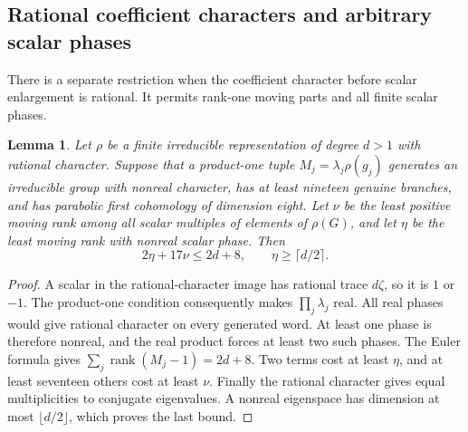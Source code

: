 \documentclass[11pt]{article}
\newtheorem{lemma}[theorem]{Lemma}
\theoremstyle{definition}
\theoremstyle{remark}
\begin{document}
\subsection{Rational coefficient characters and arbitrary scalar phases}

There is a separate restriction when the coefficient character before
scalar enlargement is rational.  It permits rank-one moving parts and
all finite scalar phases.

\begin{lemma}\label{lem:rational-scalar-budget}
Let $\rho$ be a finite irreducible representation of degree $d>1$
with rational character.  Suppose that a product-one tuple
$M_j=\lambda_j\rho(g_j)$ generates an irreducible group with nonreal
character, has at least nineteen genuine branches, and has parabolic
first cohomology of dimension eight.  Let $\nu$ be the least positive
moving rank among all scalar multiples of elements of $\rho(G)$,
and let $\eta$ be the least moving rank with nonreal scalar phase.
Then
\[
 2\eta+17\nu\le 2d+8,\qquad \eta\ge\lceil d/2\rceil.
\]
\end{lemma}
\begin{proof}
A scalar in the rational-character image has rational trace $d\zeta$,
so it is $1$ or $-1$.  The product-one condition consequently makes
$\prod_j\lambda_j$ real.  All real phases would give rational
character on every generated word.  At least one phase is therefore
nonreal, and the real product forces at least two such phases.
The Euler formula gives $\sum_j\operatorname{rank}(M_j-1)=2d+8$.
Two terms cost at least $\eta$, and at least seventeen others cost
at least $\nu$.  Finally the rational character gives equal
multiplicities to conjugate eigenvalues.  A nonreal eigenspace has
dimension at most $\lfloor d/2\rfloor$, which proves the last bound.
\end{proof}
\end{document}
